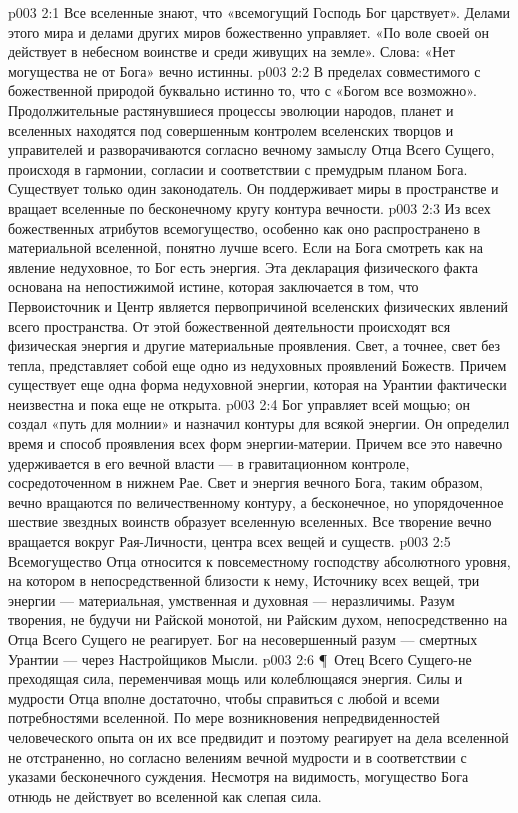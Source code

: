 \vs p003 2:1 Все вселенные знают, что «всемогущий Господь Бог царствует». Делами этого мира и делами других миров божественно управляет. «По воле своей он действует в небесном воинстве и среди живущих на земле». Слова: «Нет могущества не от Бога» вечно истинны.
\vs p003 2:2 В пределах совместимого с божественной природой буквально истинно то, что с «Богом все возможно». Продолжительные растянувшиеся процессы эволюции народов, планет и вселенных находятся под совершенным контролем вселенских творцов и управителей и разворачиваются согласно вечному замыслу Отца Всего Сущего, происходя в гармонии, согласии и соответствии с премудрым планом Бога. Существует только один законодатель. Он поддерживает миры в пространстве и вращает вселенные по бесконечному кругу контура вечности.
\vs p003 2:3 Из всех божественных атрибутов всемогущество, особенно как оно распространено в материальной вселенной, понятно лучше всего. Если на Бога смотреть как на явление недуховное, то Бог есть энергия. Эта декларация физического факта основана на непостижимой истине, которая заключается в том, что Первоисточник и Центр является первопричиной вселенских физических явлений всего пространства. От этой божественной деятельности происходят вся физическая энергия и другие материальные проявления. Свет, а точнее, свет без тепла, представляет собой еще одно из недуховных проявлений Божеств. Причем существует еще одна форма недуховной энергии, которая на Урантии фактически неизвестна и пока еще не открыта.
\vs p003 2:4 Бог управляет всей мощью; он создал «путь для молнии» и назначил контуры для всякой энергии. Он определил время и способ проявления всех форм энергии\hyp{}материи. Причем все это навечно удерживается в его вечной власти --- в гравитационном контроле, сосредоточенном в нижнем Рае. Свет и энергия вечного Бога, таким образом, вечно вращаются по величественному контуру, а бесконечное, но упорядоченное шествие звездных воинств образует вселенную вселенных. Все творение вечно вращается вокруг Рая\hyp{}Личности, центра всех вещей и существ.
\vs p003 2:5 Всемогущество Отца относится к повсеместному господству абсолютного уровня, на котором в непосредственной близости к нему, Источнику всех вещей, три энергии --- материальная, умственная и духовная --- неразличимы. Разум творения, не будучи ни Райской монотой, ни Райским духом, непосредственно на Отца Всего Сущего не реагирует. Бог  на несовершенный разум --- смертных Урантии --- через Настройщиков Мысли.
\vs p003 2:6 \P\ Отец Всего Сущего\hyp{}не преходящая сила, переменчивая мощь или колеблющаяся энергия. Силы и мудрости Отца вполне достаточно, чтобы справиться с любой и всеми потребностями вселенной. По мере возникновения непредвиденностей человеческого опыта он их все предвидит и поэтому реагирует на дела вселенной не отстраненно, но согласно велениям вечной мудрости и в соответствии с указами бесконечного суждения. Несмотря на видимость, могущество Бога отнюдь не действует во вселенной как слепая сила.
